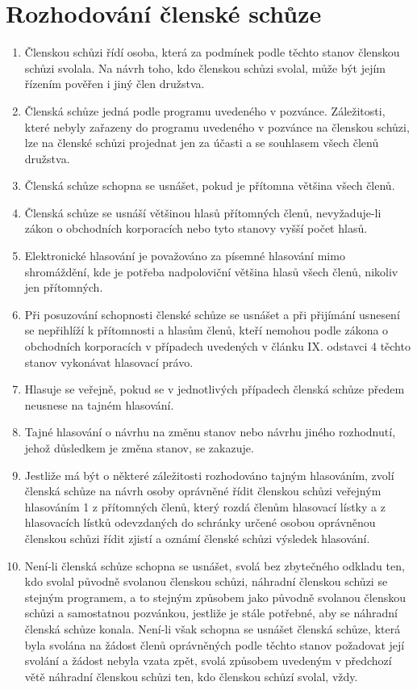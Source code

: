 \section{Rozhodování členské schůze}
\begin{enumerate}
    \item Členskou schůzi řídí osoba, která za podmínek podle těchto stanov členskou schůzi svolala. Na návrh toho, kdo členskou schůzi svolal, může být jejím řízením pověřen i jiný člen družstva.
    \item Členská schůze jedná podle programu uvedeného v pozvánce. Záležitosti, které nebyly zařazeny do programu uvedeného v pozvánce na členskou schůzi, lze na členské schůzi projednat jen za účasti a se souhlasem všech členů družstva.
    \item Členská schůze schopna se usnášet, pokud je přítomna většina všech členů.
    \item Členská schůze se usnáší většinou hlasů přítomných členů, nevyžaduje-li zákon o obchodních korporacích nebo tyto stanovy vyšší počet hlasů.
    \item Elektronické hlasování je považováno za písemné hlasování mimo shromáždění, kde je potřeba nadpoloviční většina hlasů všech členů, nikoliv jen přítomných.
    \item Při posuzování schopnosti členské schůze se usnášet a při přijímání usnesení se nepřihlíží k přítomnosti a hlasům členů, kteří nemohou podle zákona o obchodních korporacích v případech uvedených v článku IX. odstavci 4 těchto stanov vykonávat hlasovací právo.
    \item Hlasuje se veřejně, pokud se v jednotlivých případech členská schůze předem neusnese na tajném hlasování.
    \item Tajné hlasování o návrhu na změnu stanov nebo návrhu jiného rozhodnutí, jehož důsledkem je změna stanov, se zakazuje.
    \item Jestliže má být o některé záležitosti rozhodováno tajným hlasováním, zvolí členská schůze na návrh osoby oprávněné řídit členskou schůzi veřejným hlasováním 1 z přítomných členů, který rozdá členům hlasovací lístky a z hlasovacích lístků odevzdaných do schránky určené osobou oprávněnou členskou schůzi řídit zjistí a oznámí členské schůzi výsledek hlasování.
    \item Není-li členská schůze schopna se usnášet, svolá bez zbytečného odkladu ten, kdo svolal původně svolanou členskou schůzi, náhradní členskou schůzi se stejným programem, a to stejným způsobem jako původně svolanou členskou schůzi a samostatnou pozvánkou, jestliže je stále potřebné, aby se náhradní členská schůze konala. Není-li však schopna se usnášet členská schůze, která byla svolána na žádost členů oprávněných podle těchto stanov požadovat její svolání a žádost nebyla vzata zpět, svolá způsobem uvedeným v předchozí větě náhradní členskou schůzi ten, kdo členskou schůzí svolal, vždy.

\end{enumerate}
